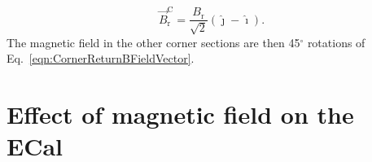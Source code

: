 \begin{equation}
  \overrightarrow{B}^{\textrm{C}}_{\textrm{r}} = \frac{B_{\textrm{r}}}{\sqrt{2}}(\hat{\jmath} - \hat{\imath}).
  \label{eqn:CornerReturnBFieldVector}
\end{equation}
The magnetic field in the other corner sections are then 45$^\circ$ rotations of Eq.~\ref{eqn:CornerReturnBFieldVector}.
\newline
\newline

\section{Effect of magnetic field on the ECal}
\label{sec:MagneticFieldEffect}
